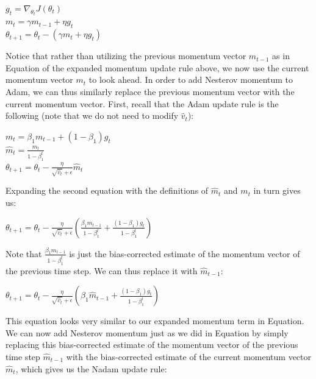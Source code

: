 \documentclass[4pt,journal,compsoc]{IEEEtran}
\begin{document}
\begin{flushleft}
    $g_t = \nabla_{\theta_t}J(\theta_t)$\\
    $m_t = \gamma m_{t-1} + \eta g_t$\\
    $\theta_{t+1} = \theta_t - (\gamma m_t + \eta g_t)$ \newline

    
    Notice that rather than utilizing the previous momentum vector $m_{t-1}$ as in Equation of the expanded momentum update rule above, we now use the current momentum vector $m_t$ to look ahead. In order to add Nesterov momentum to Adam, we can thus similarly replace the previous momentum vector with the current momentum vector. First, recall that the Adam update rule is the following (note that we do not need to modify $\hat{v}_t$): \newline
    
    $m_t = \beta_1 m_{t-1} + (1 - \beta_1) g_t$\\
    $\hat{m}_t = \frac{m_t}{1 - \beta^t_1}$\\
    $\theta_{t+1} = \theta_{t} - \frac{\eta}{\sqrt{\hat{v}_t} + \epsilon} \hat{m}_t$ \newline
    
    Expanding the second equation with the definitions of $\hat{m}_t$ and $m_t$ in turn gives us: \newline
    
    $\theta_{t+1} = \theta_{t} - \frac{\eta}{\sqrt{\hat{v}_t} + \epsilon} (\frac{\beta_1 m_{t-1}}{1 - \beta^t_1} + \frac{(1 - \beta_1) g_t}{1 - \beta^t_1})$ \newline

    Note that $\frac{\beta_1 m_{t-1}}{1 - \beta^t_1}$ is just the bias-corrected estimate of the momentum vector of the previous time step. We can thus replace it with $\hat{m}_{t-1}$: \newline
    
    $\theta_{t+1} = \theta_{t} - \frac{\eta}{\sqrt{\hat{v}_t} + \epsilon} (\beta_1 \hat{m}_{t-1} + \frac{(1 - \beta_1) g_t}{1 - \beta^t_1})$ \newline

    This equation looks very similar to our expanded momentum term in Equation. We can now add Nesterov momentum just as we did in Equation by simply replacing this bias-corrected estimate of the momentum vector of the previous time step $\hat{m}_{t-1}$ with the bias-corrected estimate of the current momentum vector $\hat{m}_t$, which gives us the Nadam update rule: \newline
    

\end{flushleft}
\end{document}
